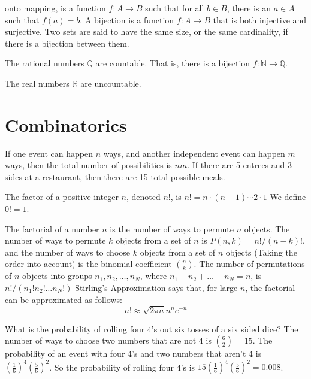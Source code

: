        onto mapping, is a function $f:A\rightarrow{B}$
        such that for all $b\in{B}$, there is an
        $a\in{A}$ such that $f(a)=b$. A bijection is a
        function $f:A\rightarrow{B}$ that is both
        injective and surjective. Two sets are said to
        have the same size, or the same cardinality,
        if there is a bijection between them.
        \begin{theorem}
            The rational numbers $\mathbb{Q}$ are countable.
            That is, there is a bijection
            $f:\mathbb{N}\rightarrow\mathbb{Q}$.
        \end{theorem}
        \begin{theorem}
            The real numbers $\mathbb{R}$ are uncountable.
        \end{theorem}
    \section{Combinatorics}
        If one event can happen $n$ ways, and another independent
        event can happen $m$ ways, then the total number
        of possibilities is $nm$. If there are 5 entrees
        and 3 sides at a restaurant, then there are
        15 total possible meals.
        \begin{definition}
            The factor of a positive integer
            $n$, denoted $n!$, is
            $n!=n\cdot(n-1)\cdots{2}\cdot{1}$
            We define $0!=1$.
        \end{definition}
        The factorial of a number $n$ is the number
        of ways to permute $n$ objects. The number of ways
        to permute $k$ objects from a set of $n$ is
        $P(n,k)=n!/(n-k)!$, and the number of ways to
        choose $k$ objects from a set of $n$ objects
        (Taking the order into account) is the
        binomial coefficient $\binom{n}{k}$. The number
        of permutations of $n$ objects into groups
        $n_{1},n_{2},\hdots,n_{N}$, where
        $n_{1}+n_{2}+\hdots+n_{N}=n$, is
        $n!/(n_{1}!n_{2}!\hdots{n_{N}!})$
        Stirling's Approximation says that, for large
        $n$, the factorial can be approximated as follows:
        \begin{equation*}
            n!\approx\sqrt{2\pi{n}}n^{n}e^{-n}
        \end{equation*}
        \begin{example}
            What is the probability of rolling
            four 4's out six tosses of a six sided
            dice? The number of ways to choose
            two numbers that are not 4 is
            $\binom{6}{2}=15$. The probability of
            an event with four 4's and two numbers
            that aren't 4 is
            $(\frac{1}{6})^{4}(\frac{5}{6})^{2}$.
            So the probability of rolling four 4's is
            $15(\frac{1}{6})^{4}(\frac{5}{6})^{2}=0.008$.
        \end{example}
